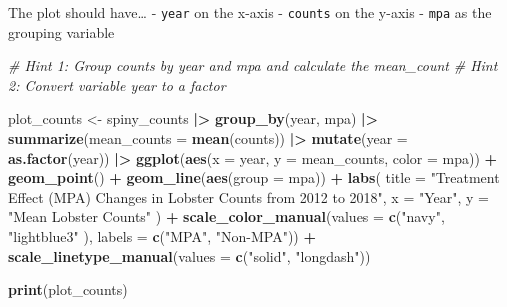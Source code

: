 \documentclass[
]{article}
\newenvironment{Shaded}{\begin{snugshade}}{\end{snugshade}}
\newcommand{\AttributeTok}[1]{\textcolor[rgb]{0.13,0.29,0.53}{#1}}
\newcommand{\CommentTok}[1]{\textcolor[rgb]{0.56,0.35,0.01}{\textit{#1}}}
\newcommand{\FunctionTok}[1]{\textcolor[rgb]{0.13,0.29,0.53}{\textbf{#1}}}
\newcommand{\NormalTok}[1]{#1}
\newcommand{\OtherTok}[1]{\textcolor[rgb]{0.56,0.35,0.01}{#1}}
\newcommand{\SpecialCharTok}[1]{\textcolor[rgb]{0.81,0.36,0.00}{\textbf{#1}}}
\newcommand{\StringTok}[1]{\textcolor[rgb]{0.31,0.60,0.02}{#1}}
\begin{document}
The plot should have\ldots{} - \texttt{year} on the x-axis -
\texttt{counts} on the y-axis - \texttt{mpa} as the grouping variable

\begin{Shaded}
\begin{Highlighting}[]
\CommentTok{\# Hint 1: Group counts by \textasciigrave{}year\textasciigrave{} and \textasciigrave{}mpa\textasciigrave{} and calculate the \textasciigrave{}mean\_count\textasciigrave{}}
\CommentTok{\# Hint 2: Convert variable \textasciigrave{}year\textasciigrave{} to a factor}

\NormalTok{plot\_counts }\OtherTok{\textless{}{-}}\NormalTok{ spiny\_counts }\SpecialCharTok{|\textgreater{}} 
    \FunctionTok{group\_by}\NormalTok{(year, mpa) }\SpecialCharTok{|\textgreater{}} 
    \FunctionTok{summarize}\NormalTok{(}\AttributeTok{mean\_counts =} \FunctionTok{mean}\NormalTok{(counts)) }\SpecialCharTok{|\textgreater{}} 
    \FunctionTok{mutate}\NormalTok{(}\AttributeTok{year =} \FunctionTok{as.factor}\NormalTok{(year)) }\SpecialCharTok{|\textgreater{}} 
    \FunctionTok{ggplot}\NormalTok{(}\FunctionTok{aes}\NormalTok{(}\AttributeTok{x =}\NormalTok{ year, }\AttributeTok{y =}\NormalTok{ mean\_counts, }\AttributeTok{color =}\NormalTok{ mpa)) }\SpecialCharTok{+}
    \FunctionTok{geom\_point}\NormalTok{() }\SpecialCharTok{+}
    \FunctionTok{geom\_line}\NormalTok{(}\FunctionTok{aes}\NormalTok{(}\AttributeTok{group =}\NormalTok{ mpa)) }\SpecialCharTok{+}
    \FunctionTok{labs}\NormalTok{(}
        \AttributeTok{title =} \StringTok{"Treatment Effect (MPA) Changes in Lobster Counts from 2012 to 2018"}\NormalTok{,}
        \AttributeTok{x =} \StringTok{"Year"}\NormalTok{,}
        \AttributeTok{y =} \StringTok{"Mean Lobster Counts"}
\NormalTok{    ) }\SpecialCharTok{+}
    \FunctionTok{scale\_color\_manual}\NormalTok{(}\AttributeTok{values =} \FunctionTok{c}\NormalTok{(}\StringTok{"navy"}\NormalTok{, }\StringTok{"lightblue3"}\NormalTok{ ),}
                       \AttributeTok{labels =} \FunctionTok{c}\NormalTok{(}\StringTok{"MPA"}\NormalTok{, }\StringTok{"Non{-}MPA"}\NormalTok{)) }\SpecialCharTok{+}
    \FunctionTok{scale\_linetype\_manual}\NormalTok{(}\AttributeTok{values =} \FunctionTok{c}\NormalTok{(}\StringTok{"solid"}\NormalTok{, }\StringTok{"longdash"}\NormalTok{))}

\FunctionTok{print}\NormalTok{(plot\_counts)}
\end{Highlighting}
\end{Shaded}
\end{document}
